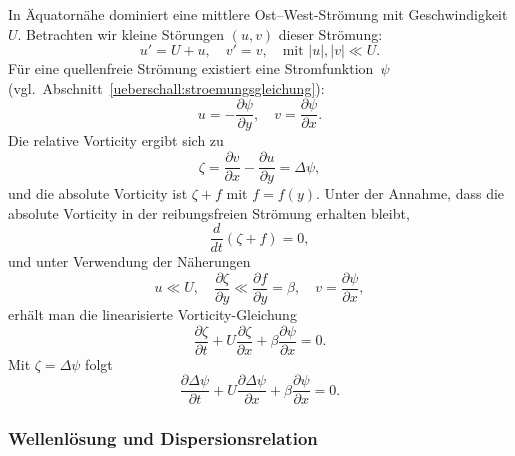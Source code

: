 In Äquatornähe dominiert eine mittlere Ost–West-Strömung mit Geschwindigkeit
\(U\). Betrachten wir kleine Störungen \((u,v)\) dieser Strömung:
\begin{equation}
	u' = U + u, \quad v' = v, \quad \text{mit } |u|, |v| \ll U.
	\label{rossby:eq:perturbation}
\end{equation}
Für eine quellenfreie Strömung existiert eine Stromfunktion~$\psi$ (vgl.~Abschnitt~\ref{ueberschall:stroemungsgleichung}):
\begin{equation}
	u = -\frac{\partial \psi}{\partial y}, \quad v = \frac{\partial \psi}{\partial x}.
	\label{rossby:eq:stream_function}
\end{equation}
Die relative Vorticity ergibt sich zu
\begin{equation}
	\zeta = \frac{\partial v}{\partial x} - \frac{\partial u}{\partial y} = \Delta \psi,
	\label{rossby:eq:relative_vorticity}
\end{equation}
und die absolute Vorticity ist \(\zeta + f\) mit \(f = f(y)\). Unter der Annahme, dass die absolute Vorticity in der reibungsfreien Strömung erhalten bleibt,
\begin{equation}
	\frac{d}{dt} (\zeta + f) = 0,
	\label{rossby:eq:absolute_vorticity_conservation}
\end{equation}
und unter Verwendung der Näherungen
\begin{equation}
	u \ll U, \quad \frac{\partial \zeta}{\partial y} \ll \frac{\partial f}{\partial y} = \beta, \quad v = \frac{\partial \psi}{\partial x},
	\label{rossby:eq:linear_approximations}
\end{equation}
erhält man die linearisierte Vorticity-Gleichung
\begin{equation}
	\frac{\partial \zeta}{\partial t} + U \frac{\partial \zeta}{\partial x} + \beta \frac{\partial \psi}{\partial x} = 0.
	\label{rossby:eq:linear_vorticity_equation}
\end{equation}
Mit \(\zeta = \Delta \psi\) folgt
\begin{equation}
	\frac{\partial \Delta \psi}{\partial t} + U \frac{\partial \Delta \psi}{\partial x} + \beta \frac{\partial \psi}{\partial x} = 0.
	\label{rossby:eq:linear_vorticity_equation_psi}
\end{equation}

\subsubsection{Wellenlösung und Dispersionsrelation}

